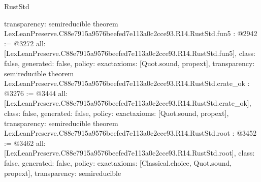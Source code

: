 \begin{lexlean}{RustStd}
\begin{coremodule}
{  transparency: semireducible
}
theorem LexLeanPreserve.C88e7915a9576beefed7e113a0c2cce93.R14.RustStd.fun5 : @2942 := @3272 {
  all: [LexLeanPreserve.C88e7915a9576beefed7e113a0c2cce93.R14.RustStd.fun5],
  class: false,
  generated: false,
  policy: exact{axioms: [Quot.sound, propext]},
  transparency: semireducible
}
theorem LexLeanPreserve.C88e7915a9576beefed7e113a0c2cce93.R14.RustStd.crate_ok : @3276 := @3444 {
  all: [LexLeanPreserve.C88e7915a9576beefed7e113a0c2cce93.R14.RustStd.crate_ok],
  class: false,
  generated: false,
  policy: exact{axioms: [Quot.sound, propext]},
  transparency: semireducible
}
theorem LexLeanPreserve.C88e7915a9576beefed7e113a0c2cce93.R14.RustStd.root : @3452 := @3462 {
  all: [LexLeanPreserve.C88e7915a9576beefed7e113a0c2cce93.R14.RustStd.root],
  class: false,
  generated: false,
  policy: exact{axioms: [Classical.choice, Quot.sound, propext]},
  transparency: semireducible
}


\end{coremodule}
\end{lexlean}
